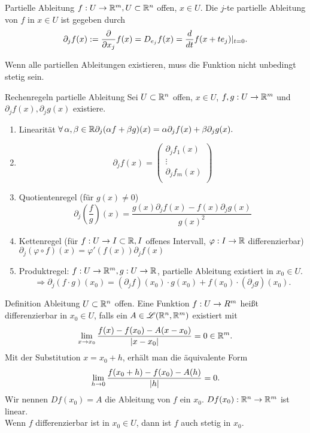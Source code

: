 \documentclass[main.tex]{subfiles}
\begin{document}
\begin{karte}{Partielle Ableitung}
    \( f : U \rightarrow \mathbb{R}^m, U \subset \mathbb{R}^n \) offen, \( x\in U \).
    Die \(j\)-te partielle Ableitung von \(f\) in \(x \in U\) 
    ist gegeben durch
    \[ \partial_j f(x) := \frac{\partial}{\partial x_j} f(x) 
    = D_{e_j} f(x) = \frac{d}{dt} f(x + t e_j) \vert_{t=0}. \]

    Wenn alle partiellen Ableitungen existieren, muss die Funktion 
    nicht unbedingt stetig sein.
\end{karte}
\begin{karte}{Rechenregeln partielle Ableitung}
    Sei \( U \subset \mathbb{R}^n \) offen, \( x\in U \), 
    \( f,g : U \rightarrow \mathbb{R}^m \) und 
    \( \partial_j f(x), \partial_j g(x) \) existiere.
    \begin{enumerate}
        \item Linearität \( \forall \alpha, \beta \in \R 
        \partial_j (\alpha f + \beta g)(x) 
        = \alpha \partial_j f(x) + \beta \partial_j g(x). \)
        \item \[ \partial_j f(x) = \begin{pmatrix}
            \partial_j f_1(x) \\
            \vdots \\
            \partial_j f_m(x) \\
        \end{pmatrix} \]
        \item Quotientenregel (für \( g(x) \neq 0 \))
        \[ \partial_j \left(\frac{f}{g}\right)(x) 
        = \frac{g(x) \partial_j f(x) - f(x) \partial_j g(x)}{g(x)^2} \]
        \item Kettenregel (für \( f : U \rightarrow I \subset \mathbb{R}, 
        I \) offenes Intervall, 
        \( \varphi : I \rightarrow \mathbb{R} \) differenzierbar)
        \( \partial_j (\varphi \circ f)(x) 
        = \varphi'(f(x)) \partial_j f(x) \)
        \item Produktregel: \( f : U \rightarrow \mathbb{R}^m, 
        g : U \rightarrow \mathbb{R} \), partielle Ableitung 
        existiert in \( x_0 \in U \).
        \[ \Rightarrow \partial_j(f\cdot g)(x_0) 
        = (\partial_j f)(x_0)\cdot g(x_0) + f(x_0)\cdot (\partial_j g)(x_0). \]
    \end{enumerate}
\end{karte}

\begin{karte}{Definition Ableitung}
    \( U \subset \mathbb{R}^n \) offen. Eine Funktion \(f : U \rightarrow R^m\)
    heißt differenzierbar in \(x_0 \in U\), falls ein
    \( A \in \mathscr{L}(\mathbb{R}^n, \mathbb{R}^m) \) existiert mit
    \[ \lim\limits_{x\rightarrow x_0} \frac{f(x) -f(x_0) - A(x-x_0)}{\left| x-x_0 \right|} 
    = 0 \in \mathbb{R}^m. \]
    Mit der Substitution \( x = x_0 + h \), 
    erhält man die äquivalente Form 
    \[ \lim\limits_{h\rightarrow 0} \frac{ f(x_0 + h) - f(x_0) - A(h) }{\left| h \right|} = 0. \]
    Wir nennen \( Df(x_0) = A \) die Ableitung von \(f\) ein \(x_0\). 
    \( Df(x_0) : \mathbb{R}^n \rightarrow \mathbb{R}^m \) ist linear.\\
    Wenn \( f \) differenzierbar ist in \( x_0 \in U \), dann ist 
    \( f \) auch stetig in \( x_0 \).
\end{karte}
\end{document}
